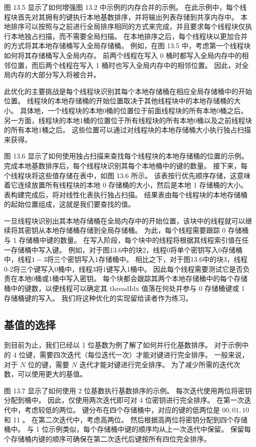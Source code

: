 图 13.5 显示了如何增强图 13.2 中示例的内存合并的示例。 在此示例中，每个线程块首先对其拥有的键执行本地基数排序，并将输出列表存储到共享内存中。 本地排序可以按照与之前进行全局排序相同的方式来完成，并且要求每个线程块仅执行本地独占扫描，而不需要全局扫描。 在本地排序之后，每个线程块以更加合并的方式将其本地存储桶写入全局存储桶。 例如，在图 13.5 中，考虑第一个线程块如何将其存储桶写入全局内存。 前两个线程在写入 0 桶时都写入全局内存中的相邻位置，而后两个线程在写入 1 桶时也写入全局内存中的相邻位置。 因此，对全局内存的大部分写入将被合并。

此优化的主要挑战是每个线程块识别其每个本地存储桶在相应全局存储桶中的开始位置。 线程块的本地存储桶的开始位置取决于其他线程块中的本地存储桶的大小。 具体地，一个线程块的本地0桶的位置位于前面线程块的所有本地0桶之后。 另一方面，线程块的本地1桶的位置位于所有线程块的所有本地0桶以及之前线程块的所有本地1桶之后。 这些位置可以通过对线程块的本地存储桶大小执行独占扫描来获得。

图 13.6 显示了如何使用独占扫描来查找每个线程块的本地存储桶的位置的示例。 完成本地基数排序后，每个线程块识别其每个本地桶中的键的数量。 接下来，每个线程块将这些值存储在表中，如图 13.6 所示。 该表按行优先顺序存储，这意味着它连续放置所有线程块的本地 0 存储桶的大小，然后是本地 1 存储桶的大小。 表构建完成后，将对线性化表执行独占扫描。 结果表由每个线程块的本地存储桶的起始位置组成，这就是我们要查找的值。

一旦线程块识别出其本地存储桶在全局内存中的开始位置，该块中的线程就可以继续将其密钥从本地存储桶存储到全局存储桶。 为此，每个线程需要跟踪 0 存储桶与 1 存储桶中键的数量。 在写入阶段，每个块中的线程将根据其线程索引值在任一存储桶中写入键。 例如，对于图13.6中的块2，线程0将单个密钥写入0存储桶中，线程$1-3$将三个密钥写入1存储桶中。 相比之下，对于图13.6中的块3，线程0-2将三个键写入0桶中，线程3将1键写入1桶中。 因此每个线程需要测试它是否负责在本地0桶或1桶中写入密钥。 每个块都会跟踪其两个本地存储桶中的每个存储桶中的键数，以便线程可以确定其 threadIdx 值落在何处并参与 0 存储桶键或 1 存储桶键的写入。 我们将这种优化的实现留给读者作为练习。

\subsection{基值的选择}
到目前为止，我们已经以 1 位基数为例了解了如何并行化基数排序。 对于示例中的 4 位键，需要四次迭代（每位迭代一次）才能对键进行完全排序。 一般来说，对于 $N$ 位的键，需要 $N$ 迭代才能对键进行完全排序。 为了减少所需的迭代次数，可以使用更大的基值。

图 13.7 显示了如何使用 2 位基数执行基数排序的示例。 每次迭代使用两位将密钥分配到桶中。 因此，仅使用两次迭代即可对 4 位密钥进行完全排序。 在第一次迭代中，考虑较低的两位。 键分布在四个存储桶中，对应的键的低两位是 $00,01,10$ 和 11 。 在第二次迭代中，考虑高两位。 然后根据高两位将密钥分配到四个存储桶中。 与 1 位示例类似，每个存储桶中键的顺序均从上一次迭代中保留。 保留每个存储桶内键的顺序可确保在第二次迭代后键按所有四位完全排序。

